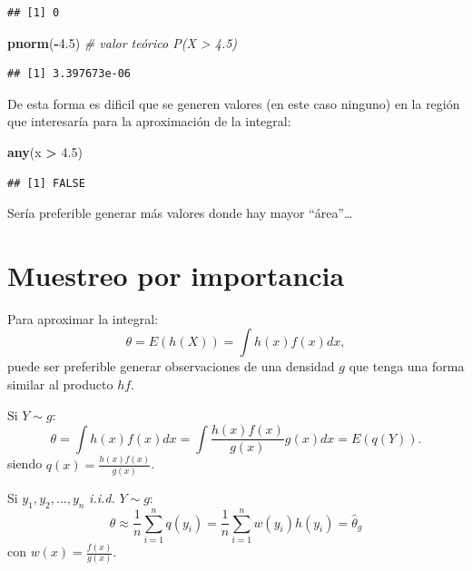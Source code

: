 \documentclass[]{book}
\newenvironment{Shaded}{\begin{snugshade}}{\end{snugshade}}
\newcommand{\KeywordTok}[1]{\textcolor[rgb]{0.13,0.29,0.53}{\textbf{#1}}}
\newcommand{\FloatTok}[1]{\textcolor[rgb]{0.00,0.00,0.81}{#1}}
\newcommand{\StringTok}[1]{\textcolor[rgb]{0.31,0.60,0.02}{#1}}
\newcommand{\CommentTok}[1]{\textcolor[rgb]{0.56,0.35,0.01}{\textit{#1}}}
\newcommand{\OperatorTok}[1]{\textcolor[rgb]{0.81,0.36,0.00}{\textbf{#1}}}
\newcommand{\NormalTok}[1]{#1}
\theoremstyle{definition}
\theoremstyle{definition}
\theoremstyle{definition}
\theoremstyle{remark}
\begin{document}
\begin{verbatim}
## [1] 0
\end{verbatim}

\begin{Shaded}
\begin{Highlighting}[]
\KeywordTok{pnorm}\NormalTok{(}\OperatorTok{-}\FloatTok{4.5}\NormalTok{)  }\CommentTok{# valor teórico P(X > 4.5) }
\end{Highlighting}
\end{Shaded}

\begin{verbatim}
## [1] 3.397673e-06
\end{verbatim}

De esta forma es dificil que se generen valores (en este caso ninguno)
en la región que interesaría para la aproximación de la integral:

\begin{Shaded}
\begin{Highlighting}[]
\KeywordTok{any}\NormalTok{(x }\OperatorTok{>}\StringTok{ }\FloatTok{4.5}\NormalTok{)}
\end{Highlighting}
\end{Shaded}

\begin{verbatim}
## [1] FALSE
\end{verbatim}

Sería preferible generar más valores donde hay mayor ``área''\ldots{}

\section{Muestreo por importancia}\label{muestreo-por-importancia}

Para aproximar la integral:
\[\theta = E\left( h\left( X\right) \right) = \int h\left( x\right) f(x)dx,\]
puede ser preferible generar observaciones de una densidad \(g\) que
tenga una forma similar al producto \(hf\).

Si \(Y\sim g\): \[\theta  = \int h\left( x\right) f(x)dx 
 = \int \frac{h\left( x\right) f(x)}{g(x)}g(x)dx
 = E\left( q\left( Y\right) \right).\] siendo
\(q\left( x\right) = \frac{h\left( x\right) f(x)}{g(x)}\).

Si \(y_{1},y_{2},\ldots ,y_{n}\) \emph{i.i.d.} \(Y\sim g\):
\[\theta \approx \frac{1}{n}\sum\limits_{i=1}^{n}q\left( y_{i}\right) 
= \frac{1}{n}\sum\limits_{i=1}^{n}w(y_{i})h\left( y_{i}\right)  
= \hat{\theta}_{g}\] con \(w\left( x\right) = \frac{f(x)}{g(x)}\).
\end{document}
